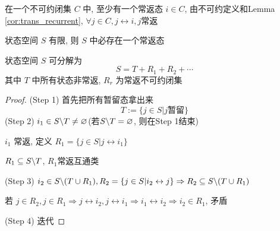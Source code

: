 在一个不可约闭集 $C$ 中, 至少有一个常返态 $i\in C$, 由不可约定义和Lemma \ref{cor:trans_recurrent}, $\forall j\in C,j\leftrightarrow i,j$常返

\begin{corollary}
    状态空间 $S$ 有限, 则 $S$ 中必存在一个常返态
\end{corollary}

\begin{theorem}[分解定理]
    状态空间 $S$ 可分解为
    \[
    S=T+R_1+R_2+\cdots
    \]
    其中 $T$ 中所有状态非常返, $R_r$ 为常返不可约闭集
\end{theorem}
\begin{proof}
(Step 1) 首先把所有暂留态拿出来
\[
T:=\{j\in S|j\text{暂留}\}
\]
(Step 2) $i_1\in S\backslash T\neq \varnothing$(若$S\backslash T=\varnothing$, 则在Step 1结束)

$i_1$ 常返, 定义 $R_1=\{j\in S|j\leftrightarrow i_1\}$

$R_1\subseteq S\backslash T$, $R_1$常返互通类

(Step 3) $i_2\in S\backslash (T\cup R_1),R_2=\{j\in S|i_2\leftrightarrow j\}\Rightarrow R_2\subseteq S\backslash (T\cup R_1)$

若 $j\in R_2,j\in R_1\Rightarrow j\leftrightarrow i_2,j\leftrightarrow i_1\Rightarrow i_1\leftrightarrow i_2\Rightarrow i_2\in R_1$, 矛盾

(Step 4) 迭代
\end{proof}
\newpage